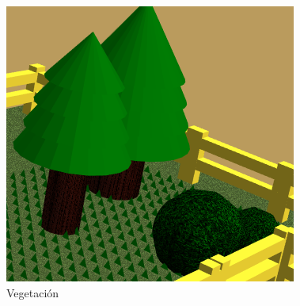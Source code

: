 \documentclass[11pt]{article}
\begin{document}
\begin{figure}[H]
    \centering    
    \includegraphics[scale=0.5]{img/vegetacion.png}
    \caption{Vegetación}
\end{figure}
\end{document}
